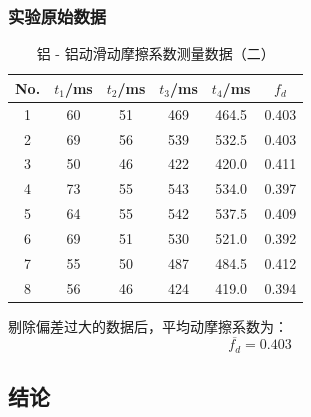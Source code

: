 \subsubsection{实验原始数据}
\begin{table}[h!]
    \centering
    \renewcommand{\arraystretch}{1.5}
    \setlength{\tabcolsep}{8pt}
    \begin{tabular}{|c|c|c|c|c|c|}
    \hline
    \textbf{No.} & $t_1$/ms & $t_2$/ms & $t_3$/ms & $t_4$/ms & $f_d$ \\ \hline
    1 & 60 & 51 & 469 & 464.5 & 0.403 \\ \hline
    2 & 69 & 56 & 539 & 532.5 & 0.403 \\ \hline
    3 & 50 & 46 & 422 & 420.0 & 0.411 \\ \hline
    4 & 73 & 55 & 543 & 534.0 & 0.397 \\ \hline
    5 & 64 & 55 & 542 & 537.5 & 0.409 \\ \hline
    6 & 69 & 51 & 530 & 521.0 & 0.392 \\ \hline
    7 & 55 & 50 & 487 & 484.5 & 0.412 \\ \hline
    8 & 56 & 46 & 424 & 419.0 & 0.394 \\ \hline
    \end{tabular}
    \caption{铝 - 铝动滑动摩擦系数测量数据（二）}
    \label{tab:dynamic_friction_data2}
\end{table}

剔除偏差过大的数据后，平均动摩擦系数为：
$$
\overline{f_d} = 0.403
$$

\subsection{结论}










